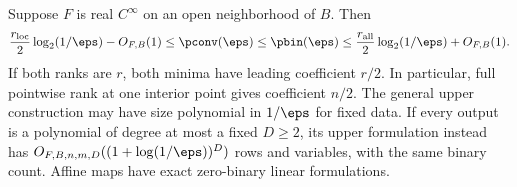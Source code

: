\begin{theorem}\label{thm:smooth-ranks}
Suppose $F$ is real $C^\infty$ on an open neighborhood of $B$. Then
\begin{equation}\label{eq:smooth-sandwich}
 \frac{r_{\mathrm{loc}}}{2}\log_2(1/\eps)-O_{F,B}(1)
 \le\pconv(\eps)\le\pbin(\eps)
 \le\frac{r_{\mathrm{all}}}{2}\log_2(1/\eps)+O_{F,B}(1).
\end{equation}
If both ranks are $r$, both minima have leading coefficient $r/2$.
In particular, full pointwise rank at one interior point gives
coefficient $n/2$. The general upper construction may have size
polynomial in $1/\eps$ for fixed data. If every output is a polynomial
of degree at most a fixed $D\ge2$, its upper formulation instead has
$O_{F,B,n,m,D}((1+\log(1/\eps))^D)$ rows and variables, with the same
binary count. Affine maps have exact zero-binary linear formulations.
\end{theorem}
